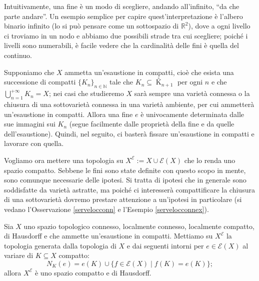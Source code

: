 Intuitivamente, una fine è un modo di scegliere, andando all'infinito, ``da che parte andare''. Un esempio semplice per capire quest'interpretazione è l'albero binario infinito (lo si può pensare come un sottospazio di $\mathbb{R}^2$), dove a ogni livello ci troviamo in un nodo e abbiamo due possibili strade tra cui scegliere; poiché i livelli sono numerabili, è facile vedere che la cardinalità delle fini è quella del continuo.

\begin{oss}
    Supponiamo che $X$ ammetta un'esaustione in compatti, cioè che esista una successione di compatti $\{K_n\}_{n\in\mathbb{N}}$ tale che $K_n\subseteq{\mathop K\limits^ \circ}_{n+1}$ per ogni $n$ e che $\displaystyle\bigcup_{n=1}^{+\infty} K_n=X$; nei casi che studieremo $X$ sarà sempre una varietà connessa o la chiusura di una sottovarietà connessa in una varietà ambiente, per cui ammetterà un'esaustione in compatti. Allora una fine $e$ è univocamente determinata dalle sue immagini sui $K_n$ (segue facilmente dalle proprietà della fine e da quelle dell'esaustione). Quindi, nel seguito, ci basterà fissare un'esaustione in compatti e lavorare con quella.
\end{oss}

Vogliamo ora mettere una topologia su $X^\mathcal{E}:=X\cup\mathcal{E}(X)$ che lo renda uno spazio compatto. Sebbene le fini sono state definite con questo scopo in mente, sono comunque necessarie delle ipotesi. Si tratta di ipotesi che in generale sono soddisfatte da varietà astratte, ma poiché ci interesserà compattificare la chiusura di una sottovarietà dovremo prestare attenzione a un'ipotesi in particolare (si vedano l'Osservazione \ref{servelocconn} e l'Esempio \ref{servelocconnex}).

\begin{prop} \label{endiscpt}
    Sia $X$ uno spazio topologico connesso, localmente connesso, localmente compatto, di Hausdorff e che ammette un'esaustione in compatti. Mettiamo su $X^\mathcal{E}$ la topologia generata dalla topologia di $X$ e dai seguenti intorni per $e\in\mathcal{E}(X)$ al variare di $K\subseteq X$ compatto:
    $$N_K(e)=e(K)\cup\{f\in\mathcal{E}(X)\mid f(K)=e(K)\};$$
    allora $X^\mathcal{E}$ è uno spazio compatto e di Hausdorff.
\end{prop}

